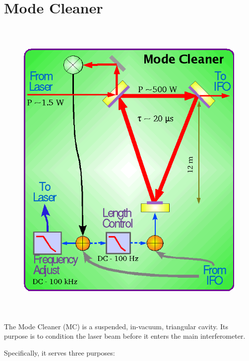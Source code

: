 \chapter{Mode Cleaner}
\label{app:ModeCleaner}

\begin{figure}[!h]
\centerline{\includegraphics[angle=0,height=6in]{Figures/AppC/MC-block_diagram.png}}
\end{figure}

The Mode Cleaner (MC) is a suspended, in-vacuum, triangular cavity. Its
purpose is to condition the laser beam before it enters the
main interferometer.

Specifically, it serves three purposes:

